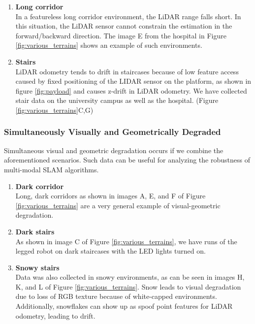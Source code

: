 \documentclass[10pt,twocolumn,letterpaper]{article}
\begin{document}


\begin{enumerate}[label=(\alph*)]
    \item \textbf{Long corridor} \\
    In a featureless long corridor environment, the LiDAR range falls short. In this situation, the LiDAR sensor cannot constrain the estimation in the forward/backward direction. The image E from the hospital in Figure \ref{fig:various_terrains} shows an example of such environments.

    \item \textbf{Stairs} \\
    LiDAR odometry tends to drift in staircases because of low feature access caused by fixed positioning of the LIDAR sensor on the platform, as shown in figure \ref{fig:payload} and causes z-drift in LiDAR odometry. We have collected stair data on the university campus as well as the hospital. (Figure \ref{fig:various_terrains}C,G)
\end{enumerate}


\subsubsection{Simultaneously Visually and Geometrically Degraded}
Simultaneous visual and geometric degradation occurs if we combine the aforementioned scenarios. Such data can be useful for analyzing the robustness of multi-modal SLAM algorithms.
\begin{enumerate}[label=(\alph*)]
    \item \textbf{Dark corridor} \\
    Long, dark corridors as shown in images A, E, and F of Figure \ref{fig:various_terrains} are a very general example of visual-geometric degradation.
    \item \textbf{Dark stairs} \\
    As shown in image C of Figure \ref{fig:various_terrains}, we have runs of the legged robot on dark staircases with the LED lights turned on.
    \item \textbf{Snowy stairs} \\
    Data was also collected in snowy environments, as can be seen in images H, K, and L of Figure \ref{fig:various_terrains}. Snow leads to visual degradation due to loss of RGB texture because of white-capped environments. Additionally, snowflakes can show up as spoof point features for LiDAR odometry, leading to drift.
\end{enumerate}
\end{document}
